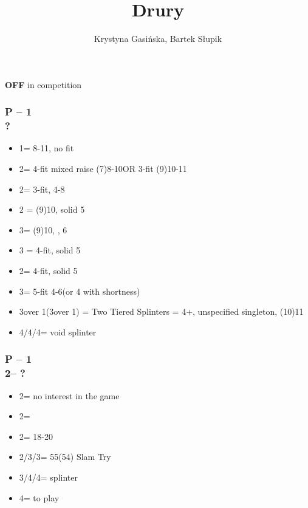\documentclass[12pt, a4paper]{article}
\title{Drury}
\author{Krystyna Gasińska, Bartek Słupik}
\begin{document}
\maketitle


{\textbf{OFF}} in competition

\subsubsection*{P -- 1\majs \\ ?}
\begin{itemize}
    \item 1\nt = 8-11, no fit
    \item 2\clubs = 4-fit mixed raise (7)8-10\dps OR 3-fit (9)10-11\dps
    \item 2\majs = 3-fit, 4-8\dps
    \item 2 = (9)10, solid 5
    \item 3\clubs = (9)10, \inv, 6\clubs
    \item 3 = 4-fit, solid 5
    \item 2\nt = 4-fit, solid 5\clubs
    \item 3\majs = 5-fit 4-6\dps (or 4 with shortness)
    \item 3\nt over 1\spades (3\spades over 1\hearts) = Two Tiered Splinters = 4+\majs, unspecified singleton, (10)11\dps \\
    \item 4\clubs/4\diams/4\hearts = void splinter
\end{itemize}

\subsubsection*{P -- 1\hearts \\ 2\clubs -- ?}
\begin{itemize}
    \item 2\hearts = no interest in the game
    \item 2\diams = \inv
    \item 2\nt = 18-20 \bal
    \item 2\spades/3\clubs/3\diams = 55(54) Slam Try
    \item 3\spades/4\clubs/4\diams = splinter
    \item 4\hearts = to play
\end{itemize}
\end{document}
